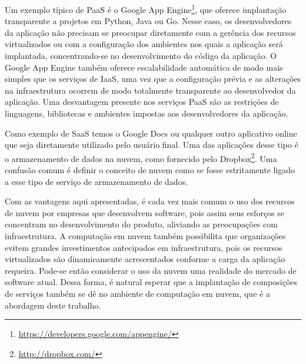 Um exemplo típico de PaaS é o Google App Engine\footnote{\url{https://developers.google.com/appengine/}}, que oferece implantação transparente a projetos em Python, Java ou Go. Nesse caso, os desenvolvedores da aplicação não precisam se preocupar diretamente com a gerência dos recursos virtualizados ou com a configuração dos ambientes nos quais a aplicação será implantada, concentrando-se no desenvolvimento do código da aplicação. O Google App Engine também oferece escalabilidade automática de modo mais simples que os serviços de IaaS, uma vez que a configuração prévia e as alterações na infraestrutura ocorrem de modo totalmente transparente ao desenvolvedor da aplicação. Uma desvantagem presente nos serviços PaaS são as restrições de linguagens, bibliotecas e ambientes impostas aos desenvolvedores da aplicação.

Como exemplo de SaaS temos o Google Docs ou qualquer outro aplicativo online que seja diretamente utilizado pelo usuário final. Uma das aplicações desse tipo é o armazenamento de dados na nuvem, como fornecido pelo Dropbox\footnote{\url{http://dropbox.com/}}. Uma confusão comum é definir o conceito de nuvem como se fosse estritamente ligado a esse tipo de serviço de armazenamento de dados.

Com as vantagens aqui apresentadas, é cada vez mais comum o uso dos recursos de nuvem por empresas que desenvolvem software, pois assim seus esforços se concentram no desenvolvimento do produto, aliviando as preocupações com infraestrutura. A computação em nuvem também possibilita que organizações evitem grandes investimentos antecipados em infraestrutura, pois os recursos virtualizados são dinamicamente acrescentados conforme a carga da aplicação requeira. Pode-se então considerar o uso da nuvem uma realidade do mercado de software atual. Dessa forma, é natural esperar que a implantação de composições de serviços também se dê no ambiente de computação em nuvem, que é a abordagem deste trabalho. 
